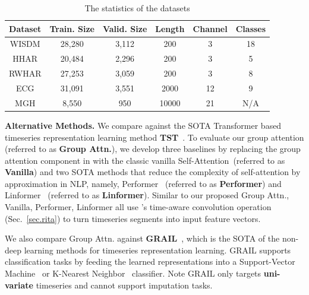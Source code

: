 \begin{table}[htbp]
\vspace{-3mm}
\centering
\footnotesize
\begin{tabular}{c|c|c|c|c|c}
\toprule
    Dataset & Train. Size & Valid. Size & Length & Channel & Classes \\
    \hline
    WISDM & 28,280 & 3,112 & 200 & 3 & 18\\
    HHAR & 20,484 & 2,296 & 200 & 3 & 5\\
    RWHAR & 27,253 & 3,059 & 200 & 3 & 8\\
    ECG & 31,091 & 3,551 & 2000 & 12 & 9\\
    MGH & 8,550 & 950 & 10000 & 21 & N/A\\
 \bottomrule
\end{tabular}
\caption{The statistics of the datasets}
\label{tab.dataset}
\vspace{-7mm}
\end{table}


\noindent\textbf{Alternative Methods.} 
We compare \system against the SOTA Transformer based timeseries representation learning method {\bf TST}~\cite{DBLP:conf/kdd/ZerveasJPBE21}. 
To evaluate our group attention (referred to as \textbf{Group Attn.}), we develop three baselines by replacing the group attention component in \system with the classic vanilla Self-Attention~\cite{DBLP:conf/nips/VaswaniSPUJGKP17}(referred to as \textbf{Vanilla}) and two SOTA methods that reduce the complexity of self-attention by approximation in NLP, namely, Performer~\cite{choromanski2020rethinking} (referred to as \textbf{Performer}) and Linformer~\cite{wang2020linformer} (referred to as \textbf{Linformer}). 
Similar to our proposed Group Attn., Vanilla, Performer, Linformer all use \system's time-aware convolution operation (Sec.~\ref{sec.rita}) to turn timeseries segments into input feature vectors.

We also compare Group Attn. against \textbf{GRAIL}~\cite{paparrizos2019grail}, which is the SOTA of the non-deep learning methods for timeseries representation learning. GRAIL supports classification tasks by feeding the learned representations into a Support-Vector Machine~\cite{cortes1995support} or K-Nearest Neighbor~\cite{fix1989discriminatory} classifier. 
Note GRAIL only targets {\bf uni-variate} timeseries and cannot support imputation tasks.

